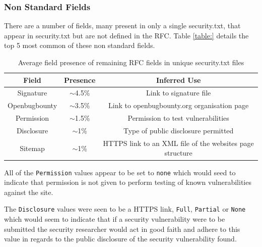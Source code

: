 \documentclass{mscreport}
\begin{document}
\subsubsection{Non Standard Fields}

There are a number of fields, many present in only a single security.txt, that appear in security.txt but are not defined in the RFC. Table \ref{table:} details the top 5 most common of these non standard fields.

\begin{table}[H]
  \begin{center}
    \begin{tabular}{|c|c|c|}  %
      \hline
      \textbf{Field} & \textbf{Presence} & \textbf{Inferred Use}\\
      \hline
      Signature & $\sim$4.5\% & Link to signature file\\
      \hline
      Openbugbounty & $\sim$3.5\% & Link to openbugbounty.org organisation page\\
      \hline
      Permission & $\sim$1.5\% & Permission to test vulnerabilities\\
      \hline
      Disclosure & $\sim$1\% & Type of public disclosure permitted\\
      \hline
      Sitemap & $\sim$1\% & HTTPS link to an XML file of the websites page structure\\
      \hline
    \end{tabular}
    \caption{Average field presence of remaining RFC fields in unique security.txt files}
    \label{table:security_txt_by_non_rfc_fields} %
  \end{center}
\end{table}

\noindent
All of the \texttt{Permission} values appear to be set to \texttt{none} which would seed to indicate that permission is not given to perform testing of known vulnerabilities against the site.

\vspace{0.3cm} \noindent
The \texttt{Disclosure} values were seen to be a HTTPS link, \texttt{Full}, \texttt{Partial} or \texttt{None} which would seem to indicate that if a security vulnerability were to be submitted the security researcher would act in good faith and adhere to this value in regards to the public disclosure of the security vulnerability found.
\end{document}
